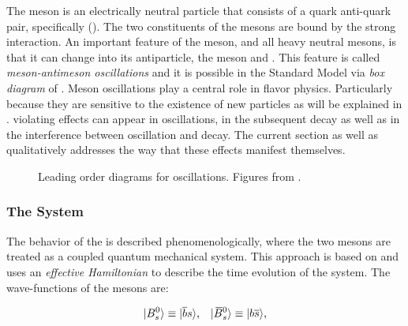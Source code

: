 The \Bs meson is an electrically neutral particle that consists of a quark anti-quark pair, specifically (\bquarkbar\squark).
The two constituents of the mesons are bound by the strong interaction. An important feature of
the \Bs meson, and all heavy neutral mesons, is that it can change into its antiparticle,
the \Bsb meson and \viceversa. This feature is called {\it meson-antimeson oscillations} and it is possible
in the Standard Model via  {\it box diagram} of .
Meson oscillations play a central role in flavor physics. Particularly because they are sensitive to the
existence of new particles as will be explained in . \CP violating effects can
appear in \BBbarSyst oscillations, in the subsequent decay as well as in the interference between oscillation
and decay. The current section as well as  qualitatively addresses the way that
these effects manifest themselves.

\begin{figure}[!h]
  \centering
  \begin{subfigure}{0.5\textwidth}
    \centering
    \raggedright
    \scalebox{0.9}{\sffamily }
    \caption{}
    \label{bs_box_1}
  \end{subfigure}%
  \hfill%
  \begin{subfigure}{0.5\textwidth}
    \centering
    \raggedleft
    \scalebox{0.9}{\sffamily }
    \caption{}
    \label{bs_box_2}
  \end{subfigure}
  \caption{Leading order diagrams for \BBbarSyst oscillations. Figures from \cite{jeroenThesis}.}
  \label{bs_box}
\end{figure}

\subsubsection{The \BBbarSyst System}
\label{the_bbar_system}

The behavior of the \BBbarSyst is described phenomenologically, where the two mesons are treated as a
coupled quantum mechanical system. This approach
is based on \cite{Weisskopf:1930au,Weisskopf:1930ps} and uses an {\it effective Hamiltonian}
\cite{eff-hamiltonian-bs-syst,DeBruyn-thesis} to describe the time evolution of the system.
The wave-functions of the mesons are:

\begin{equation}
  \centering
  \ket{\Bs}  \equiv  \ket{\bquarkbar\squark}, \;\;\; \ket{\Bsb} \equiv  \ket{\bquark\squarkbar},
  \label{bs_wavefunctions}
\end{equation}

